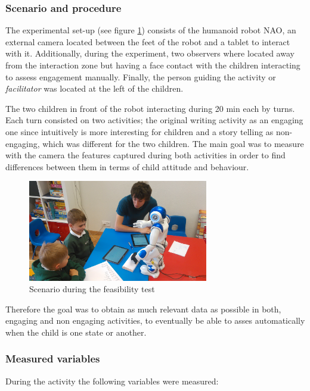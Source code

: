 \subsubsection{Scenario and procedure}
The experimental set-up (see figure \ref{fig:feasibility}) consists of the humanoid robot NAO, an external camera located between the feet of the robot and a tablet to interact with it. Additionally, during the experiment, two observers where located away from the interaction zone but having a face contact with the children interacting to assess engagement manually. Finally, the person guiding the activity or \textit{facilitator} was located at the left of the children. 

The two children in front of the robot interacting during 20 min each by turns. Each turn consisted on two activities; the original writing activity as an engaging one since intuitively is more interesting for children and a story telling as non-engaging, which was different for the two children. The main goal was to measure with the camera the features captured during both activities in order to find differences between them in terms of child attitude and behaviour.

\bigskip
\begin{figure}[h!]
        \centering
        \includegraphics[width=0.7\textwidth]{figures/feasibility.jpg}
        \caption{Scenario during the feasibility test}
        \label{fig:feasibility}
\end{figure}

Therefore the goal was to obtain as much relevant data as possible in both, engaging and non engaging activities, to eventually be able to asses automatically when the child is one state or another.

\subsubsection{Measured variables} \label{measuredVariables}
During the activity the following variables were measured:

